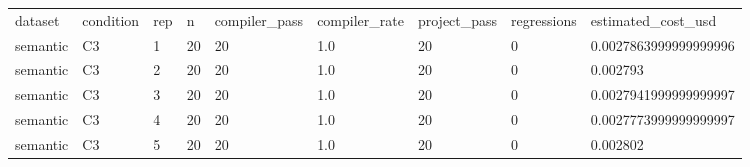 \begin{tabular}{lllllllll}
dataset & condition & rep & n & compiler\_pass & compiler\_rate & project\_pass & regressions & estimated\_cost\_usd \\
semantic & C3 & 1 & 20 & 20 & 1.0 & 20 & 0 & 0.0027863999999999996 \\
semantic & C3 & 2 & 20 & 20 & 1.0 & 20 & 0 & 0.002793 \\
semantic & C3 & 3 & 20 & 20 & 1.0 & 20 & 0 & 0.0027941999999999997 \\
semantic & C3 & 4 & 20 & 20 & 1.0 & 20 & 0 & 0.0027773999999999997 \\
semantic & C3 & 5 & 20 & 20 & 1.0 & 20 & 0 & 0.002802 \\
\end{tabular}